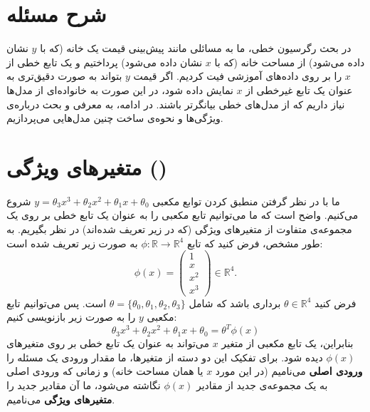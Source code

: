 \documentclass[12pt]{article}
\begin{document}
\fontsize{12pt}{14pt}\selectfont




\section{شرح مسئله}
در بحث رگرسیون خطی، ما به مسائلی مانند پیش‌بینی قیمت یک خانه (که با
$y$
نشان داده می‌شود) از مساحت خانه (که با
$x$
نشان داده می‌شود) پرداختیم و یک تابع خطی از
$x$
را بر روی داده‌های آموزشی فیت کردیم. اگر قیمت
$y$
بتواند به صورت دقیق‌تری به عنوان یک تابع غیرخطی از
$x$
نمایش داده شود، در این صورت به خانواده‌ای از مدل‌ها نیاز داریم که از مدل‌های خطی بیانگرتر باشند. در ادامه، به معرفی و بحث درباره‌ی ویژگی‌ها و نحوه‌ی ساخت چنین مدل‌هایی می‌پردازیم.

\section{متغیر‌های ویژگی ()}
ما با در نظر گرفتن منطبق کردن توابع مکعبی
$y = \theta_3x^3+ \theta_2x^2+ \theta_1x+ \theta_0$
شروع می‌کنیم. واضح است که ما می‌توانیم تابع مکعبی را به عنوان یک تابع خطی بر روی یک مجموعه‌ی متفاوت از متغیرهای ویژگی (که در زیر تعریف شده‌اند) در نظر بگیریم. به طور مشخص، فرض کنید که تابع
$\phi : \mathbb{R} \to \mathbb{R}^4$
به صورت زیر تعریف شده است:
$$
\phi(x) = 
\begin{pmatrix}
1 \\
x \\
x^2 \\
x^3
\end{pmatrix} \in \mathbb{R}^4.
$$
فرض کنید
$\theta \in \mathbb{R}^4$
برداری باشد که شامل
$\theta = \{\theta_0, \theta_1, \theta_2, \theta_3\}$
است. پس می‌توانیم تابع مکعبی
$y$
را به صورت زیر بازنویسی کنیم:
$$
\theta_3x^3 + \theta_2x^2 + \theta_1x + \theta_0 = \theta^T\phi(x)
$$
بنابراین، یک تابع مکعبی از متغیر
$x$
می‌تواند به عنوان یک تابع خطی بر روی متغیرهای
$\phi(x)$
دیده شود. برای تفکیک این دو دسته از متغیرها، ما مقدار ورودی یک مسئله را 
\textbf{ورودی اصلی}
می‌نامیم (در این مورد
$x$
یا همان مساحت خانه) و زمانی که ورودی اصلی به یک مجموعه‌ی جدید از مقادیر
$\phi(x)$
نگاشته می‌شود، ما آن مقادیر جدید را
\textbf{متغیرهای ویژگی}
می‌نامیم.
\end{document}
